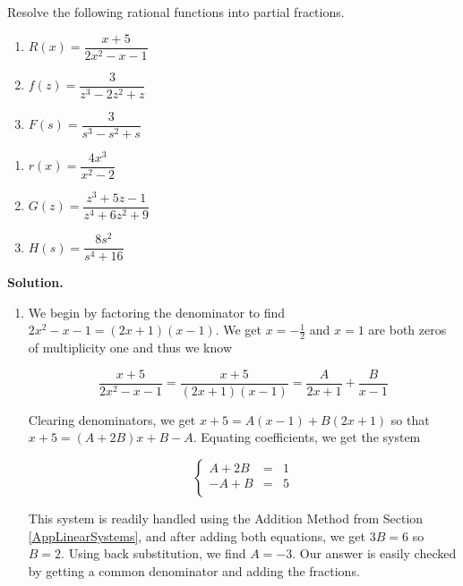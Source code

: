 \begin{ex}  Resolve the following rational functions into partial fractions.

\begin{multicols}{3}
\begin{enumerate}

\item  $R(x) = \dfrac{x+5}{2x^2-x-1}$

\item  $f(z) = \dfrac{3}{z^3-2z^2+z}$

\item  $F(s) = \dfrac{3}{s^3-s^2+s}$

\setcounter{HW}{\value{enumi}}
\end{enumerate}
\end{multicols}


\begin{multicols}{3}
\begin{enumerate}
\setcounter{enumi}{\value{HW}}

\item  $r(x) = \dfrac{4x^3}{x^2-2}$

\item  $G(z) = \dfrac{z^3+5z-1}{z^4+6z^2+9}$

\item  $H(s) = \dfrac{8s^2}{s^4+16}$

\end{enumerate}
\end{multicols}
{\bf Solution.}  

\begin{enumerate}

\item  We begin by factoring the denominator to find $2x^2-x-1 = (2x+1)(x-1)$.  We get $x=-\frac{1}{2}$ and $x=1$ are both zeros of multiplicity one and thus we know

\[\dfrac{x+5}{2x^2-x-1} = \dfrac{x+5}{(2x+1)(x-1)} = \dfrac{A}{2x+1} + \dfrac{B}{x-1}\]

Clearing denominators, we get $x+5 = A(x-1) + B(2x+1)$ so that $x + 5 = (A+2B)x + B-A$.  Equating coefficients, we get the system

\[ \left\{ \begin{array}{rcr}  A+2B & = & 1 \\ -A+B & = & 5 \\ \end{array} \right.\]

This system is readily handled using the Addition Method from Section \ref{AppLinearSystems}, and after adding both equations, we get $3B = 6$ so $B = 2$.  Using back substitution, we find $A = -3$.  Our answer is easily checked by getting a common denominator and adding the fractions.


\end{enumerate}
\end{ex}
